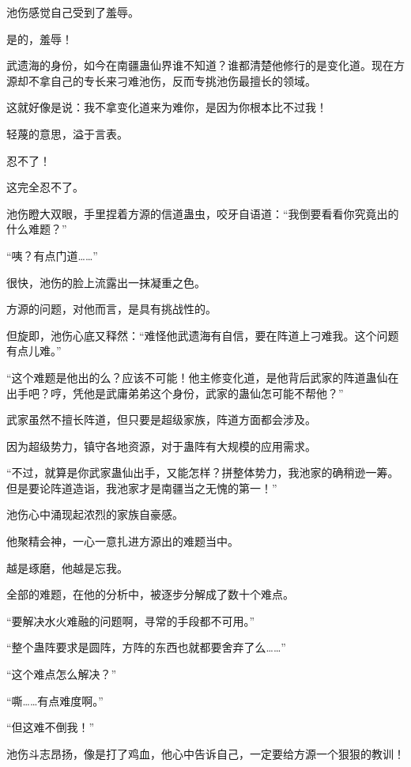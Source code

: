 
\begin{this_body}



池伤感觉自己受到了羞辱。

是的，羞辱！

武遗海的身份，如今在南疆蛊仙界谁不知道？谁都清楚他修行的是变化道。现在方源却不拿自己的专长来刁难池伤，反而专挑池伤最擅长的领域。

这就好像是说：我不拿变化道来为难你，是因为你根本比不过我！

轻蔑的意思，溢于言表。

忍不了！

这完全忍不了。

池伤瞪大双眼，手里捏着方源的信道蛊虫，咬牙自语道：“我倒要看看你究竟出的什么难题？”

“咦？有点门道……”

很快，池伤的脸上流露出一抹凝重之色。

方源的问题，对他而言，是具有挑战性的。

但旋即，池伤心底又释然：“难怪他武遗海有自信，要在阵道上刁难我。这个问题有点儿难。”

“这个难题是他出的么？应该不可能！他主修变化道，是他背后武家的阵道蛊仙在出手吧？哼，凭他是武庸弟弟这个身份，武家的蛊仙怎可能不帮他？”

武家虽然不擅长阵道，但只要是超级家族，阵道方面都会涉及。

因为超级势力，镇守各地资源，对于蛊阵有大规模的应用需求。

“不过，就算是你武家蛊仙出手，又能怎样？拼整体势力，我池家的确稍逊一筹。但是要论阵道造诣，我池家才是南疆当之无愧的第一！”

池伤心中涌现起浓烈的家族自豪感。

他聚精会神，一心一意扎进方源出的难题当中。

越是琢磨，他越是忘我。

全部的难题，在他的分析中，被逐步分解成了数十个难点。

“要解决水火难融的问题啊，寻常的手段都不可用。”

“整个蛊阵要求是圆阵，方阵的东西也就都要舍弃了么……”

“这个难点怎么解决？”

“嘶……有点难度啊。”

“但这难不倒我！”

池伤斗志昂扬，像是打了鸡血，他心中告诉自己，一定要给方源一个狠狠的教训！


\end{this_body}
